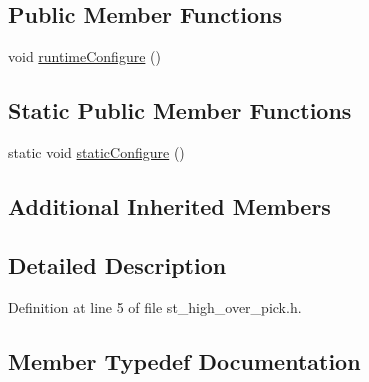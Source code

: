 \subsection*{Public Member Functions}
\begin{DoxyCompactItemize}
\item 
void \hyperlink{structsm__moveit__3_1_1StHighOverPick_ad1cbb7d9d2819d73850de1613b6cad9a}{runtime\+Configure} ()
\end{DoxyCompactItemize}
\subsection*{Static Public Member Functions}
\begin{DoxyCompactItemize}
\item 
static void \hyperlink{structsm__moveit__3_1_1StHighOverPick_a9056a1e6e003221a6a21ae8239633ba0}{static\+Configure} ()
\end{DoxyCompactItemize}
\subsection*{Additional Inherited Members}


\subsection{Detailed Description}


Definition at line 5 of file st\+\_\+high\+\_\+over\+\_\+pick.\+h.



\subsection{Member Typedef Documentation}
\mbox{\label{structsm__moveit__3_1_1StHighOverPick_a040b8ba065c27d3103b57f449a3b637f}} 
